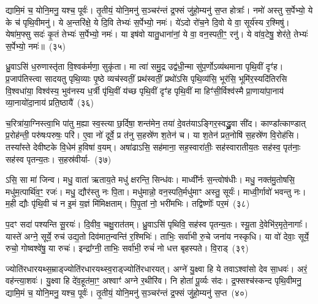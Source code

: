 द्यामि॒मं च॒ योनि॒मनु॒ यश्च॒ पूर्वः॑। तृ॒तीयं॒ योनि॒मनु॑ स॒ञ्चर॑न्तं द्र॒फ्सं जु॑हो॒म्यनु॑ स॒प्त होत्राः᳚। नमो॑ अस्तु स॒र्पेभ्यो॒ ये के च॑ पृथि॒वीमनु॑। ये अ॒न्तरि॑क्षे॒ ये दि॒वि तेभ्यः॑ स॒र्पेभ्यो॒ नमः॑। ये॑\-ऽदो रो॑च॒ने दि॒वो ये वा॒ सूर्य॑स्य र॒श्मिषु॑। येषा॑म॒फ्सु सदः॑ कृ॒तं तेभ्यः॑ स॒र्पेभ्यो॒ नमः॑। या इष॑वो यातु॒धाना॑नां॒ ये वा॒ वन॒स्पती॒ꣳ॒ रनु॑। ये वा॑व॒टेषु॒ शेर॑ते॒ तेभ्यः॑ स॒र्पेभ्यो॒ नमः॑॥~(३५)\ip

{\anuvakamend[{म॒हो\-ऽनु॑ यातु॒धाना॑ना॒मेका॑\-दश च}]}

ध्रु॒वाऽसि॑ ध॒रुणास्तृ॑ता वि॒श्वक॑र्मणा॒ सुकृ॑ता। मा त्वा॑ समु॒द्र उद्व॑धी॒न्मा सु॑प॒र्णो\-ऽव्य॑थमाना पृथि॒वीं दृꣳ॑ह। प्र॒जा\-प॑तिस्त्वा सादयतु पृथि॒व्याः पृ॒ष्ठे व्यच॑स्वतीं॒ प्रथ॑स्वतीं॒ प्रथो॑\-ऽसि पृथि॒व्य॑सि॒ भूर॑सि॒ भूमि॑र॒स्यदि॑तिरसि वि॒श्वधा॑या॒ विश्व॑स्य॒ भुव॑नस्य ध॒र्त्री पृ॑थि॒वीं य॑च्छ पृथि॒वीं दृꣳ॑ह पृथि॒वीं मा हिꣳ॑सी॒र्विश्व॑स्मै प्रा॒णाया॑पा॒नाय॑ व्या॒नायो॑दा॒नाय॑ प्रति॒ष्ठायै॑~(३६)\ip

च॒रित्रा॑या॒ग्निस्त्वा॒भि पा॑तु म॒ह्या स्व॒स्त्या छ॒र्दिषा॒ शन्त॑मेन॒ तया॑ दे॒वत॑या\-ऽ\-ङ्गिर॒स्वद्ध्रु॒वा सी॑द। काण्डा᳚त्काण्डात् प्र॒रोह॑न्ती॒ परु॑षःपरुषः॒ परि॑। ए॒वा नो॑ दूर्वे॒ प्र त॑नु स॒हस्रे॑ण श॒तेन॑ च। या श॒तेन॑ प्रत॒नोषि॑ स॒हस्रे॑ण वि॒रोह॑सि। तस्या᳚स्ते देवीष्टके वि॒धेम॑ ह॒विषा॑ व॒यम्। अषा॑ढाऽसि॒ सह॑माना॒ सह॒स्वारा॑तीः॒ सह॑स्वारातीय॒तः सह॑स्व॒ पृत॑नाः॒ सह॑स्व पृतन्य॒तः। स॒हस्र॑वीर्या-~(३७)\ip

ऽसि॒ सा मा॑ जिन्व। मधु॒ वाता॑ ऋताय॒ते मधु॑ क्षरन्ति॒ सिन्ध॑वः। माध्वी᳚र्नः स॒न्त्वोष॑धीः। मधु॒ नक्त॑मु॒तोषसि॒ मधु॑म॒त्पार्थि॑व॒ꣳ॒ रजः॑। मधु॒ द्यौर॑स्तु नः पि॒ता। मधु॑मान्नो॒ वन॒स्पति॒र्मधु॑माꣳ अस्तु॒ सूर्यः॑। माध्वी॒र्गावो॑ भवन्तु नः। म॒ही द्यौः पृ॑थि॒वी च॑ न इ॒मं य॒ज्ञं मि॑मिक्षताम्। पि॒पृ॒तां नो॒ भरी॑मभिः। तद्विष्णोः᳚ पर॒मं~(३८)\ip

प॒दꣳ सदा॑ पश्यन्ति सू॒रयः॑। दि॒वीव॒ चक्षु॒रात॑तम्। ध्रु॒वाऽसि॑ पृथिवि॒ सह॑स्व पृतन्य॒तः। स्यू॒ता दे॒वेभि॑र॒मृते॒नागाः᳚। यास्ते॑ अग्ने॒ सूर्ये॒ रुच॑ उद्य॒तो दिव॑मात॒न्वन्ति॑ र॒श्मिभिः॑। ताभिः॒ सर्वा॑भी रु॒चे जना॑य नस्कृधि। या वो॑ देवाः॒ सूर्ये॒ रुचो॒ गोष्वश्वे॑षु॒ या रुचः॑। इन्द्रा᳚ग्नी॒ ताभिः॒ सर्वा॑भी॒ रुचं॑ नो धत्त बृहस्पते। वि॒राड्~(३९)\ip

ज्योति॑रधारयथ्स॒म्राड्ज्योति॑रधारयथ्स्व॒राड्ज्योति॑रधारयत्। अग्ने॑ यु॒क्ष्वा हि ये तवा\-ऽ\-श्वा॑सो देव सा॒धवः॑। अरं॒ वह॑न्त्या॒शवः॑। यु॒क्ष्वा हि दे॑व॒हूत॑मा॒ꣳ॒ अश्वाꣳ॑ अग्ने र॒थीरि॑व। नि होता॑ पू॒र्व्यः स॑दः। द्र॒फ्सश्च॑स्कन्द पृथि॒वीमनु॒ द्यामि॒मं च॒ योनि॒मनु॒ यश्च॒ पूर्वः॑। तृ॒तीयं॒ योनि॒मनु॑ स॒ञ्चर॑न्तं द्र॒फ्सं जु॑हो॒म्यनु॑ स॒प्त~(४०)\ip

